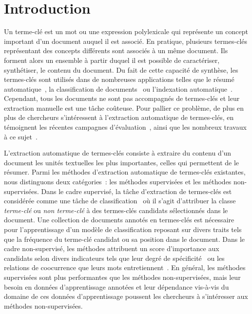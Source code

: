\section{Introduction}
\label{sec:introduction}
  Un terme-clé est un mot ou une expression polylexicale qui représente un
  concept important d'un document auquel il est associé. En pratique, plusieurs
  termes-clés représentant des concepts différents sont associés à un même
  document. Ils forment alors un ensemble à partir duquel il est possible de
  caractériser, synthétiser, le contenu du document. Du fait de cette capacité
  de synthèse, les termes-clés sont utilisés dans de nombreuses applications
  telles que le résumé automatique~\cite{avanzo2005keyphrase}, la classification
  de documents~\cite{han2007webdocumentclustering} ou l'indexation
  automatique~\cite{medelyan2008smalltrainingset}. Cependant, tous les documents
  ne sont pas accompagnés de termes-clés et leur extraction manuelle est une
  tâche coûteuse. Pour pallier ce problème, de plus en plus de chercheurs
  s'intéressent à l'extraction automatique de termes-clés, en témoignent les
  récentes campagnes d'évaluation~\cite{paroubek2012deft,kim2010semeval}, ainsi
  que les nombreux travaux à ce sujet~\cite{hasan2014state_of_the_art}.

  L'extraction automatique de termes-clés consiste à extraire du contenu d'un
  document les unités textuelles les plus importantes, celles qui permettent de
  le résumer. Parmi les méthodes d'extraction automatique de termes-clés
  existantes, nous distinguons deux catégories~: les méthodes supervisées et les
  méthodes non-supervisées. Dans le cadre supervisé, la tâche d'extraction de
  termes-clés est considérée comme une tâche de
  classification~\cite{witten1999kea} où il s'agit d'attribuer la classe
  \og{}\textit{terme-clé}\fg{} ou \og{}\textit{non terme-clé}\fg{} à des
  termes-clés candidats sélectionnés dans le document. Une collection de
  documents annotés en termes-clés est nécessaire pour l'apprentissage d'un
  modèle de classification reposant sur divers traits tels que la fréquence du
  terme-clé candidat ou sa position dans le document. Dans le cadre
  non-supervisé, les méthodes attribuent un score d'importance aux candidats
  selon divers indicateurs tels que leur degré de
  spécificité~\cite{jones1972tfidf} ou les relations de coocurrence que leurs
  mots entretiennent~\cite{mihalcea2004textrank}. En général, les méthodes
  supervisées sont plus performantes que les méthodes non-supervisées, mais leur
  besoin en données d'apprentissage annotées et leur dépendance vis-à-vis du
  domaine de ces données d'apprentissage poussent les chercheurs à s'intéresser
  aux méthodes non-supervisées.

